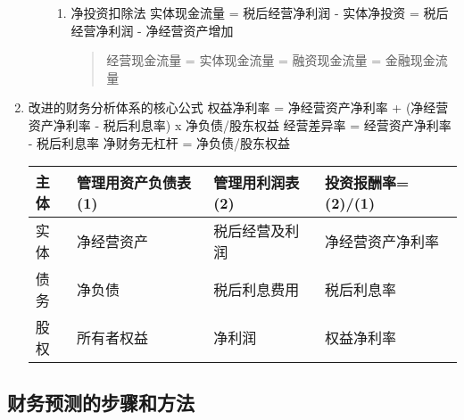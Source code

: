 \documentclass[11pt]{article}
\begin{document}
\begin{enumerate}
\begin{enumerate}
\begin{enumerate}
\item 净投资扣除法
\label{sec:orgf04b657}
实体现金流量 = 税后经营净利润 - 实体净投资
= 税后经营净利润 - 净经营资产增加
\begin{quote}
经营现金流量 = 实体现金流量 = 融资现金流量 = 金融现金流量
\end{quote}
\end{enumerate}
\end{enumerate}
\item 改进的财务分析体系的核心公式
\label{sec:orgd46c247}
权益净利率 = 净经营资产净利率 + (净经营资产净利率 - 税后利息率) x 净负债/股东权益
经营差异率 = 经营资产净利率 - 税后利息率
净财务无杠杆 = 净负债/股东权益
\begin{center}
\begin{tabular}{llll}
主体 & 管理用资产负债表(1) & 管理用利润表(2) & 投资报酬率=(2)/(1)\\
\hline
实体 & 净经营资产 & 税后经营及利润 & 净经营资产净利率\\
债务 & 净负债 & 税后利息费用 & 税后利息率\\
股权 & 所有者权益 & 净利润 & 权益净利率\\
\end{tabular}
\end{center}
\end{enumerate}
\subsection{财务预测的步骤和方法}
\label{sec:org64f469c}
\end{document}
